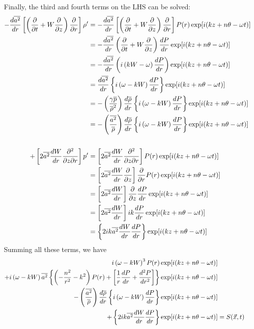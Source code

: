 \documentclass[onecolumn,10pt]{jhwhw}
\begin{document}
Finally, the third and fourth terms on the LHS can be solved:
\begin{align*}
- \dfrac{d \overline{a^2}}{dr} \left [ \left ( \dfrac{\partial}{\partial t} + W \dfrac{\partial}{\partial z} \right) \dfrac{\partial}{\partial r} \right ] \rho^{\prime} &= - \dfrac{d \overline{a^2}}{dr} \left [ \left ( \dfrac{\partial}{\partial t} + W \dfrac{\partial}{\partial z} \right) \dfrac{\partial}{\partial r} \right ] P(r) \exp[i(kz+n \theta - \omega t)] \\
&= - \dfrac{d \overline{a^2}}{dr} \left ( \dfrac{\partial}{\partial t} + W \dfrac{\partial}{\partial z} \right ) \dfrac{d P}{dr} \exp[i(kz+n \theta - \omega t)] \\
&= - \dfrac{d \overline{a^2}}{dr} \left ( i \left ( k W - \omega \right ) \dfrac{d P}{dr} \right ) \exp[i(kz+n \theta - \omega t)] \\
&= \dfrac{d \overline{a^2}}{dr} \left \{ i \left ( \omega - k W \right ) \dfrac{d P}{dr} \right \} \exp[i(kz+n \theta - \omega t)] \\
&= -\left(\dfrac{\gamma \overline{p}}{\overline{\rho}^2}\right) \frac{d \overline{\rho}}{dr} \left \{ i \left ( \omega - k W \right ) \dfrac{d P}{dr} \right \} \exp[i(kz+n \theta - \omega t)] \\
&= -\left(\dfrac{\overline{a^2}}{\overline{\rho}}\right) \frac{d \overline{\rho}}{dr} \left \{ i \left ( \omega - k W \right ) \dfrac{d P}{dr} \right \} \exp[i(kz+n \theta - \omega t)] \\
\\
+\left [ 2 \overline{a^2} \dfrac{dW}{dr} \dfrac{\partial^2 }{\partial z \partial r} \right ] p^{\prime} &= \left [ 2 \overline{a^2} \dfrac{dW}{dr} \dfrac{\partial^2 }{\partial z \partial r} \right ] P(r) \exp[i(kz+n \theta - \omega t)] \\
&= \left [ 2 \overline{a^2} \dfrac{dW}{dr} \dfrac{\partial }{\partial z} \right ] \dfrac{\partial}{\partial r} P(r) \exp[i(kz+n \theta - \omega t)] \\
&= \left [ 2 \overline{a^2} \dfrac{dW}{dr} \right ] \dfrac{\partial}{\partial z} \dfrac{d P}{d r} \exp[i(kz+n \theta - \omega t)] \\
&= \left [ 2 \overline{a^2} \dfrac{dW}{dr} \right ] ik \dfrac{d P}{d r} \exp[i(kz+n \theta - \omega t)] \\
&= \left \{ 2 ik \overline{a^2} \dfrac{dW}{dr} \dfrac{d P}{d r} \right \} \exp[i(kz+n \theta - \omega t)] \\
\end{align*}
Summing all these terms, we have
\begin{align*}
i \left ( \omega-k W \right)^3 P(r) \exp[i(kz+n \theta - \omega t)] \\
+ i \left( \omega - k W \right) \overline{a^2} \left \{ \left ( -\dfrac{n^2}{r^2} -k^2 \right ) P(r) + \left [ \dfrac{1}{r} \dfrac{d P} {d r} + \dfrac{d^2 P} {d r^2} \right ] \right \} \exp[i(kz+n \theta - \omega t)] \\
- \left(\dfrac{\overline{a^2}}{\overline{\rho}}\right) \frac{d \overline{\rho}}{dr} \left \{ i \left ( \omega - k W \right ) \dfrac{d P}{dr} \right \} \exp[i(kz+n \theta - \omega t)] \\
+ \left \{ 2 ik \overline{a^2} \dfrac{dW}{dr} \dfrac{d P}{d r} \right \} \exp[i(kz+n \theta - \omega t)] &= S(\vec{x}, t)
\end{align*}
\end{document}
